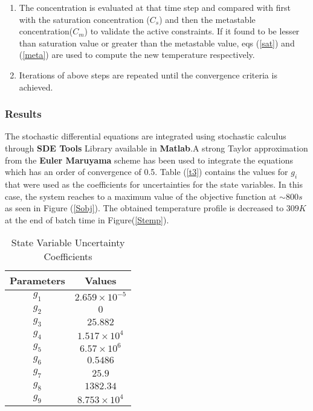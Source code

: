 \documentclass[3p,times,authoryear]{elsarticle}
\begin{document}
\begin{enumerate}
\item The concentration is evaluated  at that time step and compared with first with the saturation concentration ($C_{s}$) and then the metastable concentration($C_{m}$) to validate the active constraints. If it found to be lesser than saturation value or greater than the metastable value, eqs (\ref{sat}) and (\ref{meta}) are used to compute the new temperature respectively. 
\item Iterations of above steps are repeated until the convergence criteria is achieved.
\end{enumerate} 

\subsubsection{Results}
The stochastic differential equations are integrated using stochastic calculus through \textbf{SDE Tools} Library available in \textbf{Matlab}.A strong Taylor approximation from the \textbf{Euler Maruyama} scheme has been used to integrate the equations which has an order of convergence of 0.5. Table (\ref{t3}) contains the values for $g_{i}$ that were used as the coefficients for uncertainties for the state variables. In this case, the system reaches to a maximum value of the objective function at $\sim 800 s$ as seen in Figure (\ref{Sobj}). The obtained temperature profile is decreased to $309 K$ at the end of batch time in Figure(\ref{Stemp}). 
\begin{center}
\begin{table}[!h] 
\centering
\caption{State Variable Uncertainty Coefficients} \label{t3}
\begin{tabular}{|c|c|}
\hline
Parameters & Values \\
\hline
$g_{1}$ & $2.659\times10^{-5}$ \\
$g_{2}$ & $0$ \\
$g_{3}$ & $25.882$ \\
$g_{4}$ & $1.517\times10^{4}$ \\ 
$g_{5}$ & $6.57\times10^{6}$ \\
$g_{6}$ & $0.5486$ \\
$g_{7}$ & $25.9$\\
$g_{8}$ & $1382.34$ \\
$g_{9}$ & $8.753\times10^{4}$ \\
\hline
\end{tabular}

\label{Table2}
\end{table}
\end{center}
\end{document}
